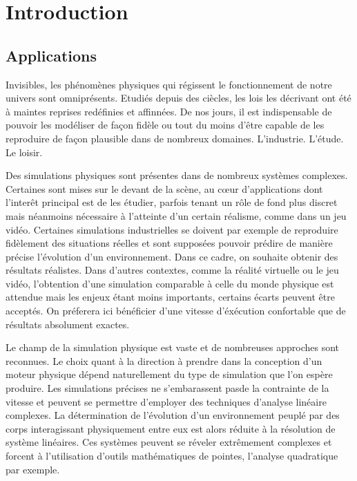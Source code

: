 \section{Introduction}

\subsection{Applications}

Invisibles, les phénomènes physiques qui régissent le fonctionnement de notre univers sont omniprésents. Etudiés depuis des ciècles, les lois les décrivant ont été à maintes reprises redéfinies et affinnées. De nos jours, il est indispensable de pouvoir les modéliser de façon fidèle ou tout du moins d'être capable de les reproduire de façon plausible dans de nombreux domaines. L'industrie. L'étude. Le loisir.

Des simulations physiques sont présentes dans de nombreux systèmes complexes. Certaines sont mises sur le devant de la scène, au c\oe ur d'applications dont l'interêt principal est de les étudier, parfois tenant un rôle de fond plus discret mais néanmoins nécessaire à l'atteinte d'un certain réalisme, comme dans un jeu vidéo. Certaines simulations industrielles se doivent par exemple de reproduire fidèlement des situations réelles et sont supposées pouvoir prédire de manière précise l'évolution d'un environnement. Dans ce cadre, on souhaite obtenir des résultats réalistes. Dans d'autres contextes, comme la réalité virtuelle ou le jeu vidéo, l'obtention d'une simulation comparable à celle du monde physique est attendue mais les enjeux étant moins importants, certains écarts peuvent être acceptés. On préferera ici bénéficier d'une vitesse d'éxécution confortable que de résultats absolument exactes.

Le champ de la simulation physique est vaste et de nombreuses approches sont reconnues. Le choix quant à la direction à prendre dans la conception d'un moteur physique dépend naturellement du type de simulation que l'on espère produire. Les simulations précises ne s'embarassent pasde la contrainte de la vitesse et peuvent se permettre d'employer des techniques d'analyse linéaire complexes. La détermination de l'évolution d'un environnement peuplé par des corps interagissant physiquement entre eux est alors réduite à la résolution de système linéaires. Ces systèmes peuvent se réveler extrêmement complexes et forcent à l'utilisation d'outils mathématiques de pointes, l'analyse quadratique par exemple.

